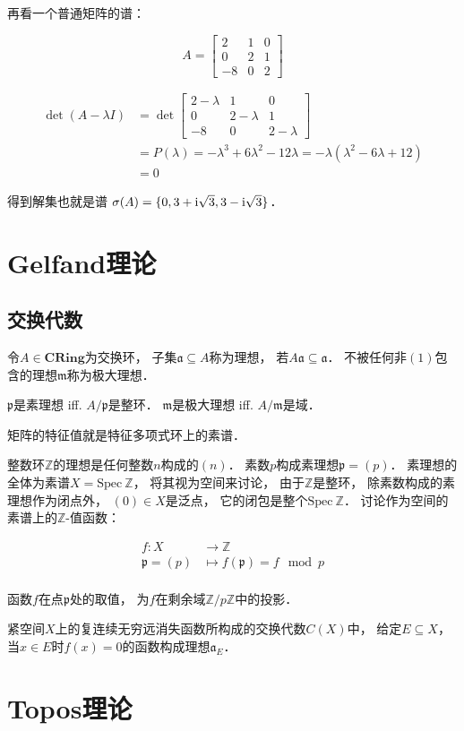 \documentclass[10pt, openany]{book}
\begin{document}
再看一个普通矩阵的谱：

$$
A = \begin{bmatrix}
  2 & 1 & 0 \\
  0 & 2 & 1 \\
  -8 & 0 & 2
\end{bmatrix}
$$

$$
\begin{aligned}
\det (A - \lambda I)
&=\det \begin{bmatrix}
  2 - \lambda & 1 & 0 \\
  0 & 2 - \lambda & 1 \\
  -8 & 0 & 2 - \lambda
\end{bmatrix} \\
&=P(\lambda)
=-\lambda^3 + 6\lambda^2 - 12\lambda
=-\lambda(\lambda^2 - 6\lambda + 12) \\
&=0
\end{aligned}
$$

得到解集也就是谱
$\sigma(A) = \{ 0, 3 + \text i\sqrt{3}, 3 - \text i\sqrt{3}\}$．

\chapter{Gelfand理论}

\section{交换代数}

令$A\in\textbf{CRing}$为交换环，
子集$\mathfrak a \subseteq A$称为理想，
若$A \mathfrak a \subseteq \mathfrak a$．
不被任何非$(1)$包含的理想$\mathfrak m$称为极大理想．

$\mathfrak p$是素理想 iff. $A/\mathfrak p$是整环．
$\mathfrak m$是极大理想 iff. $A/\mathfrak m$是域．

矩阵的特征值就是特征多项式环上的素谱．

整数环$\mathbb Z$的理想是任何整数$n$构成的$(n)$．
素数$p$构成素理想$\mathfrak p = (p)$．
素理想的全体为素谱$X = \text{Spec} \ \mathbb Z$，
将其视为空间来讨论，
由于$\mathbb Z$是整环，
除素数构成的素理想作为闭点外，
$(0)\in X$是泛点，
它的闭包是整个$\text{Spec} \ \mathbb Z$．
讨论作为空间的素谱上的$\mathbb Z$-值函数：

$$
\begin{aligned}
f: X &\to \mathbb Z \\
\mathfrak p = (p) &\mapsto f(\mathfrak p) = f \mod p \\
\end{aligned}
$$

函数$f$在点$\mathfrak p$处的取值，
为$f$在剩余域$\mathbb Z/p\mathbb Z$中的投影．

紧空间$X$上的复连续无穷远消失函数所构成的交换代数$C(X)$中，
给定$E \subseteq X$，
当$x\in E$时$f(x) = 0$的函数构成理想$\mathfrak a_E$．


\chapter{Topos理论}
\end{document}
